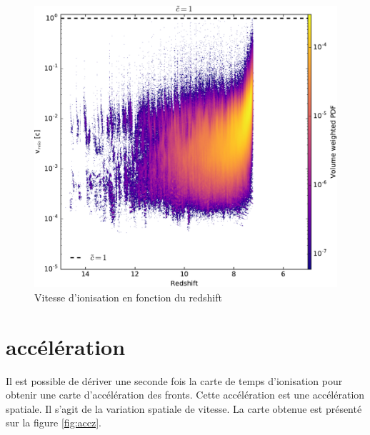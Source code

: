 \begin{figure}[htpb]
        \includegraphics[width=.95\linewidth]{img/04_mapreio/speedreio_z_c1.pdf} 
        \caption{Vitesse d'ionisation en fonction du redshift
        }
 		\label{fig:speedz}
\end{figure}


\section{accélération}
Il est possible de dériver une seconde fois la carte de temps d'ionisation pour obtenir une carte d'accélération des fronts.
Cette accélération est une accélération spatiale.
Il s'agit de la variation spatiale de vitesse.
La carte obtenue est présenté sur la figure \ref{fig:accz}.


